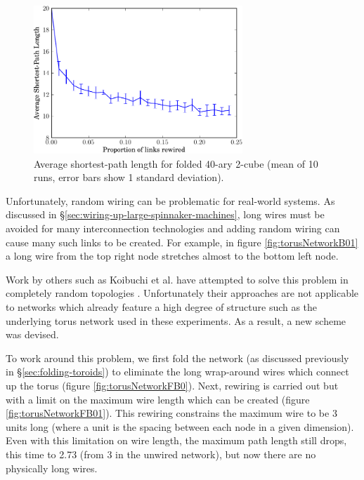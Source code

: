 			\begin{figure}
				\center
				\includegraphics[width=0.7\textwidth]{figures/smallWorldTorus}
				\caption[Average shortest-path length for folded 40-ary 2-cube.]{Average
				shortest-path length for folded 40-ary 2-cube (mean of 10 runs, error
				bars show 1 standard deviation).}
				\label{fig:smallWorldTorus}
			\end{figure}
			
			Unfortunately, random wiring can be problematic for real-world systems.
			As discussed in \S\ref{sec:wiring-up-large-spinnaker-machines}, long wires
			must be avoided for many interconnection technologies and adding random
			wiring can cause many such links to be created. For example, in figure
			\ref{fig:torusNetworkB01} a long wire from the top right node stretches
			almost to the bottom left node.
			
			Work by others such as Koibuchi et al. have attempted to solve this
			problem in completely random topologies \cite{koibuchi13}.  Unfortunately
			their approaches are not applicable to networks which already feature a
			high degree of structure such as the underlying torus network used in
			these experiments. As a result, a new scheme was devised.
			
			To work around this problem, we first fold the network (as discussed
			previously in \S\ref{sec:folding-toroids}) to eliminate the long
			wrap-around wires which connect up the torus (figure
			\ref{fig:torusNetworkFB0}). Next, rewiring is carried out but with a limit
			on the maximum wire length which can be created (figure
			\ref{fig:torusNetworkFB01}).  This rewiring constrains the maximum wire to
			be 3 units long (where a unit is the spacing between each node in a given
			dimension). Even with this limitation on wire length, the maximum path
			length still drops, this time to 2.73 (from 3 in the unwired network), but
			now there are no physically long wires.
			
